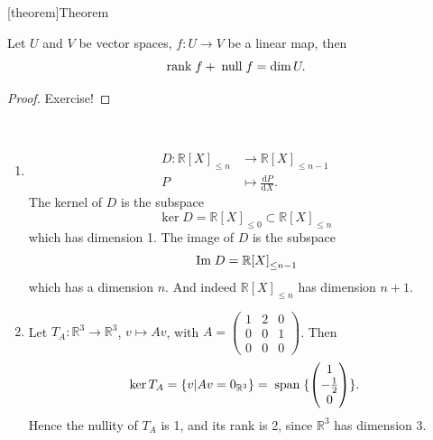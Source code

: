 \documentclass[12pt]{report}
\theoremstyle{definition}
\begin{document}
[theorem]{Theorem}
\begin{rank-nullity theorem}
    Let $U$ and $V$ be vector spaces, $f:U\rightarrow{}V$ be a linear map, then\[
        \;\textnormal{rank}\;f + \;\textnormal{null}\;f = \dim{U}.
    \]
\end{rank-nullity theorem}

\begin{proof}
    Exercise!
\end{proof}

\begin{ex}
    \,

    \begin{enumerate}[label = (\alph*)]
        \item 
            \[
                \begin{align*}
                    D:\mathbb{R}{[X]}_{\le n} & \rightarrow{}\mathbb{R}{[X]}_{\le n - 1} \\
                    P & \mapsto \frac{\mathrm{d}P}{\mathrm{d}X}.
                \end{align*}
            \]
            The kernel of $D$ is the subspace\[
                \ker{D} = \mathbb{R}{[X]}_{\le 0} \subset \mathbb{R}{[X]}_{\le n}
            \]which has dimension 1. The image of $D$ is the subspace\[
                \;\textnormal{Im}\;D = \mathbb{R}{[X]}_{\le n - 1}
            \]which has a dimension $n$. And indeed $\mathbb{R}{[X]}_{\le n}$ has dimension $n + 1$.

        \item Let $T_A:\mathbb{R}^{3}\rightarrow{}\mathbb{R}^{3}$,
            $v\mapsto Av$, with $A = \begin{pmatrix}
                1 & 2 & 0 \\
                0 & 0 & 1 \\
                0 & 0 & 0
            \end{pmatrix}$. Then\[
            \ker{T_A} = \{v|Av = 0_{\mathbb{R}^{3}}\} = \;\textnormal{span}\;\{\begin{pmatrix}
                    1 \\
                    -\frac{1}{2} \\
                    0
            \end{pmatrix}\}.
            \]Hence the nullity of $T_A$ is 1, and its rank is 2, since $\mathbb{R}^{3}$ has dimension 3.


\end{enumerate}
\end{ex}
\end{document}
